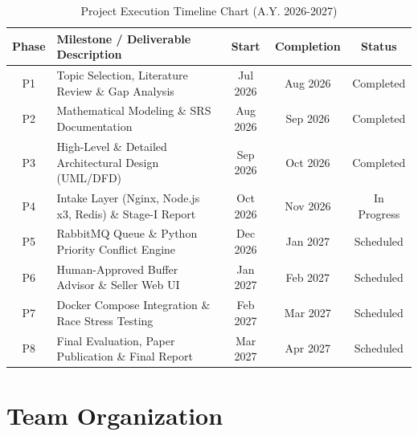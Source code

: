 \documentclass[oneside,a4paper,12pt]{report}
\newcommand{\AcademicYear}{2026-2027}
\begin{document}
\begin{table}[!htbp]
\centering
\footnotesize
\renewcommand{\arraystretch}{1.35}
\begin{tabularx}{\textwidth}{|c|X|c|c|c|}
\hline
\textbf{Phase} & \textbf{Milestone / Deliverable Description} & \textbf{Start} & \textbf{Completion} & \textbf{Status} \\ \hline
P1 & Topic Selection, Literature Review \& Gap Analysis & Jul 2026 & Aug 2026 & Completed \\ \hline
P2 & Mathematical Modeling \& SRS Documentation & Aug 2026 & Sep 2026 & Completed \\ \hline
P3 & High-Level \& Detailed Architectural Design (UML/DFD) & Sep 2026 & Oct 2026 & Completed \\ \hline
P4 & Intake Layer (Nginx, Node.js x3, Redis) \& Stage-I Report & Oct 2026 & Nov 2026 & In Progress \\ \hline
P5 & RabbitMQ Queue \& Python Priority Conflict Engine & Dec 2026 & Jan 2027 & Scheduled \\ \hline
P6 & Human-Approved Buffer Advisor \& Seller Web UI & Jan 2027 & Feb 2027 & Scheduled \\ \hline
P7 & Docker Compose Integration \& Race Stress Testing & Feb 2027 & Mar 2027 & Scheduled \\ \hline
P8 & Final Evaluation, Paper Publication \& Final Report & Mar 2027 & Apr 2027 & Scheduled \\ \hline
\end{tabularx}
\caption{Project Execution Timeline Chart (A.Y. \AcademicYear)}
\label{tab:timeline}
\end{table}

\section{Team Organization}
\end{document}
